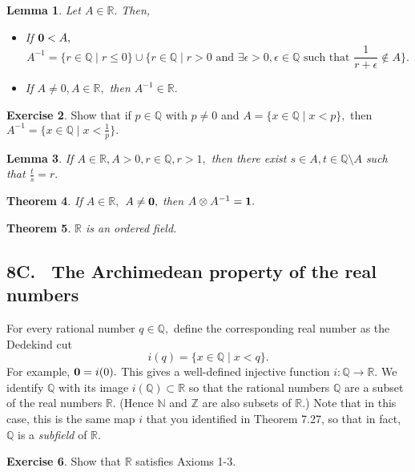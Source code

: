 \documentclass[12pt]{article}
\newcommand{\bbN}{\mathbb{N}}
\newcommand{\bbQ}{\mathbb{Q}}
\newcommand{\bbR}{\mathbb{R}}
\newcommand{\bbZ}{\mathbb{Z}}
\renewcommand{\_}[1]{\underline{ #1 }}
\newtheorem{theorem}{Theorem}[section]
\newtheorem{lemma}[theorem]{Lemma}
\theoremstyle{definition}
\newtheorem{exercise}[theorem]{Exercise}
\numberwithin{equation}{subsection}
\begin{document}
\begin{lemma}
Let $A\in\bbR.$ Then,
\begin{itemize}
\item[(a)] If ${\bf 0}<A,$ $$A^{-1}=\{r\in\bbQ\mid r\leq 0\}\cup\{r\in\bbQ\mid r>0\text{ and }\exists\epsilon>0,\epsilon\in\bbQ\text{ such that }\frac{1}{r+\epsilon}\not\in A\}.$$
\item[(b)] If $A\neq 0, A\in\bbR,$ then $A^{-1} \in\bbR.$
\end{itemize}
\end{lemma}

\begin{exercise}
Show that if $p\in\bbQ$ with $p\neq 0$ and $A=\{x\in\bbQ\mid x<p\},$ then $A^{-1}=\{x\in\bbQ\mid x<\frac{1}{p}\}.$
\end{exercise}

\begin{lemma} If $A\in\bbR, A>0, r\in\bbQ, r>1, $ then there exist $s\in A, t\in\bbQ\setminus A$ such that $\frac{t}{s}=r.$
\end{lemma}

\begin{theorem} If $A\in \bbR,$ $A\neq {\bf 0},$  then $A\otimes A^{-1}={\bf 1}.$
\end{theorem}

\begin{theorem} $\bbR$ is an ordered field.
\end{theorem}



\subsection*{8C. \ The Archimedean property of the real numbers}

For every rational number $q\in\bbQ,$ define the corresponding real number as the Dedekind cut
$$i(q)=\{x\in\bbQ\mid x<q\}.$$
For example, ${\bf 0}=i(0).$ This gives a well-defined injective function $i:\bbQ\longrightarrow \bbR.$ We identify $\bbQ$ with its image $i(\bbQ)\subset\bbR$ so that the rational numbers $\bbQ$ are a subset of the real numbers $\bbR.$ (Hence $\bbN $ and $\bbZ$ are also subsets of $\bbR$.) Note that in this case, this is the same map $i$ that you identified in Theorem 7.27, so that in fact, $\bbQ$ is a {\it subfield} of $\bbR.$ 

\begin{exercise} Show that $\bbR$ satisfies Axioms 1-3.
\end{exercise}
\end{document}
